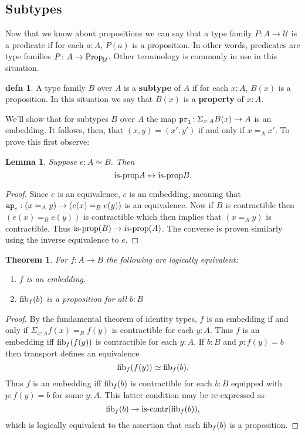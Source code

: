 \documentclass{amsart}
\theoremstyle{theorem}
\newtheorem*{thm}{Theorem}
\newtheorem*{lem}{Lemma}
\theoremstyle{definition}
\newtheorem*{defn}{defn}
\theoremstyle{remark}
\newcommand{\0}{\mathbbe{0}}
\newcommand{\1}{\mathbbe{1}}
\newcommand{\2}{\mathbbe{2}}
\newcommand{\3}{\mathbbe{3}}
\newcommand{\4}{\mathbbe{4}}
\newcommand{\term}[1]{{\textup{\texttt{#1}}}}
\newcommand{\type}[1]{{\textup{#1}}}
\newcommand{\pr}{\term{pr}}
\newcommand{\ap}{\term{ap}}
\newcommand{\UU}{{\mathcal{U}}}
\newcommand{\iscontr}{\type{is-contr}}
\newcommand{\isprop}{\type{is-prop}}
\newcommand{\fib}{\type{fib}}
\newcommand{\Prop}{\type{Prop}_{\UU}}
\renewcommand{\iff}{\leftrightarrow}
\begin{document}
\subsection*{Subtypes}

Now that we know about propositions we can say that a type family $P \colon A \to \UU$ is a predicate if for each $a :A$, $P(a)$ is a proposition. In other words, predicates are type families $P \colon A \to \Prop$. Other terminology is commonly in use in this situation.

\begin{defn} A type family $B$ over $A$ is a \textbf{subtype} of $A$ if for each $x:A$, $B(x)$ is a proposition. In this situation we say that $B(x)$ is a \textbf{property} of $x:A$.
\end{defn}

We'll show that for subtypes $B$ over $A$ the map $\pr_1 \colon \Sigma_{x:A} B(x) \to A$ is an embedding. It follows, then, that $(x,y) = (x',y')$ if and only if $x=_Ax'$. To prove this first observe:

\begin{lem} Suppose $e : A\simeq B$. Then 
\[ \isprop{A} \iff \isprop{B}.\]
\end{lem}

\begin{proof}
Since $e$ is an equivalence, $e$ is an embedding, meaning that $\ap_e : (x=_Ay) \to (e(x)=_B e(y))$ is an equivalence. Now if $B$ is contractible then $(e(x)=_Be(y))$ is contractible which then implies that $(x=_Ay)$ is contractible. Thus $\isprop(B) \to \isprop(A)$. The converse is proven similarly using the inverse equivalence to $e$.
\end{proof}

\begin{thm} For $f : A \to B$ the following are logically equivalent:
\begin{enumerate}
\item $f$ is an embedding.
\item $\fib_f(b)$ is a proposition for all $b : B$
\end{enumerate}
\end{thm}
\begin{proof}
By the fundamental theorem of identity types, $f$ is an embedding if and only if $\Sigma_{x:A}f(x)=_B f(y)$ is contractible for each $y :A$. Thus $f$ is an embedding iff $\fib_f(f(y))$ is contractible for each $y : A$. If $b:B$ and $p : f(y) = b$ then transport defines an equivalence
\[ \fib_f(f(y)) \simeq \fib_f(b).\]
Thus $f$ is an embedding iff $\fib_f(b)$ is contractible for each $b : B$ equipped with $p : f(y) = b$ for some $y:A$. This latter condition may be re-expressed as \[ \fib_f(b) \to \iscontr(\fib_f(b)),\]
which is logically equivalent to the assertion that each $\fib_f(b)$ is a proposition.
\end{proof}
\end{document}
